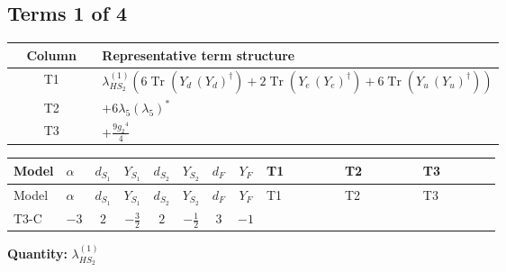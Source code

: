 \documentclass[8pt]{article}
\begin{document}
\begin{landscape}
\subsection*{Terms 1 of 4}
\begin{center}
\begin{tabular}{@{}c >{\raggedright\arraybackslash}p{0.82\linewidth}@{}}
\toprule
Column & Representative term structure \\
\midrule
T1 & \(\displaystyle {\lambda_{HS_2}^{(1)}} (6 \operatorname{Tr}\!\left({Y_d}\,\left({Y_d}\right)^{\dagger}\right)+2 \operatorname{Tr}\!\left({Y_e}\,\left({Y_e}\right)^{\dagger}\right)+6 \operatorname{Tr}\!\left({Y_u}\,\left({Y_u}\right)^{\dagger}\right))\) \\
\midrule
T2 & \(\displaystyle +6 {\lambda_5} \left({\lambda_5}\right)^{*}\) \\
\midrule
T3 & \(\displaystyle +\frac{9 {g_2}^4}{4}\) \\
\midrule
\bottomrule
\end{tabular}
\end{center}
\smallskip
\tiny
\begin{longtable}{@{}llcccccc >{\raggedright\arraybackslash}p{0.21\linewidth} >{\raggedright\arraybackslash}p{0.21\linewidth} >{\raggedright\arraybackslash}p{0.21\linewidth}@{}}
\toprule
Model & $\alpha$ & $d_{S_1}$ & $Y_{S_1}$ & $d_{S_2}$ & $Y_{S_2}$ & $d_F$ & $Y_F$ & T1 & T2 & T3 \\
\midrule
\endfirsthead
\toprule
Model & $\alpha$ & $d_{S_1}$ & $Y_{S_1}$ & $d_{S_2}$ & $Y_{S_2}$ & $d_F$ & $Y_F$ & T1 & T2 & T3 \\
\midrule
\endhead
T3-C & $-3$ & $2$ & $-\frac{3}{2}$ & $2$ & $-\frac{1}{2}$ & $3$ & $-1$ & \scriptsize\adjustbox{max width=\linewidth}{$\begin{gathered} {\lambda_{HS_2}^{(1)}} (6 \operatorname{Tr}\!\left({Y_d}\,\left({Y_d}\right)^{\dagger}\right)+2 \operatorname{Tr}\!\left({Y_e}\,\left({Y_e}\right)^{\dagger}\right)+6 \operatorname{Tr}\!\left({Y_u}\,\left({Y_u}\right)^{\dagger}\right))\end{gathered}$} & \scriptsize\adjustbox{max width=\linewidth}{$\begin{gathered} +6 {\lambda_5} \left({\lambda_5}\right)^{*}\end{gathered}$} & \scriptsize\adjustbox{max width=\linewidth}{$\begin{gathered} +\frac{9 {g_2}^4}{4}\end{gathered}$} \\
\midrule
\bottomrule
\end{longtable}
\clearpage
\noindent\textbf{Quantity: }$\lambda_{HS_2}^{(1)}$\par\smallskip

\end{landscape}
\end{document}
